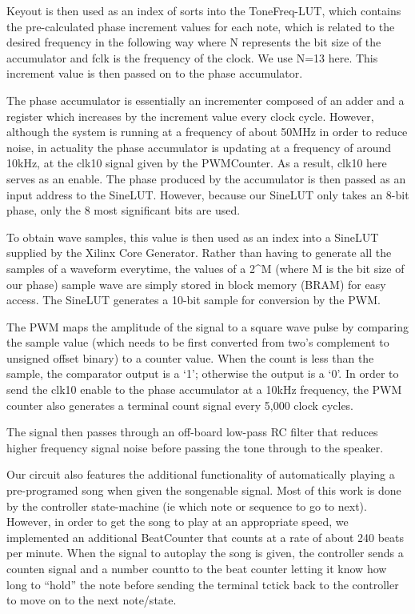 \documentclass{article}
\begin{document}
    Key\textunderscore out is then used as an index of sorts into the ToneFreq-LUT, which contains the pre-calculated phase increment values for each note, which is related to the desired frequency in the following way
    where N represents the bit size of the accumulator and fclk is the frequency of the clock. We use N=13 here. This increment value is then passed on to the phase accumulator.

    The phase accumulator is essentially an incrementer composed of an adder and a register which increases by the increment value every clock cycle. However, although the system is running at a frequency of about 50MHz in order to reduce noise, in actuality the phase accumulator is updating at a frequency of around 10kHz, at the clk10 signal given by the PWMCounter. As a result, clk10 here serves as an enable. The phase produced by the accumulator is then passed as an input address to the SineLUT. However, because our SineLUT only takes an 8-bit phase, only the 8 most significant bits are used.

    To obtain wave samples, this value is then used as an index into a SineLUT supplied by the Xilinx Core Generator. Rather than having to generate all the samples of a waveform everytime, the values of a 2^M (where M is the bit size of our phase) sample wave are simply stored in block memory (BRAM) for easy access. The SineLUT generates a 10-bit sample for conversion by the PWM.

    The PWM maps the amplitude of the signal to a square wave pulse by comparing the sample value (which needs to be first converted from two's complement to unsigned offset binary) to a counter value. When the count is less than the sample, the comparator output is a `1'; otherwise the output is a `0'. In order to send the clk10 enable to the phase accumulator at a 10kHz frequency, the PWM counter also generates a terminal count signal every 5,000 clock cycles. 

    The signal then passes through an off-board low-pass RC filter that reduces higher frequency signal noise before passing the tone through to the speaker.

    Our circuit also features the additional functionality of automatically playing a pre-programed song when given the song\textunderscore enable signal. Most of this work is done by the controller state-machine (ie which note or sequence to go to next). However, in order to get the song to play at an appropriate speed, we implemented an additional BeatCounter that counts at a rate of about 240 beats per minute. When the signal to autoplay the song is given, the controller sends a count\textunderscore en signal and a number count\textunderscore to to the beat counter letting it know how long to ``hold'' the note before sending the terminal tc\textunderscore tick back to the controller to move on to the next note/state.
\end{document}
